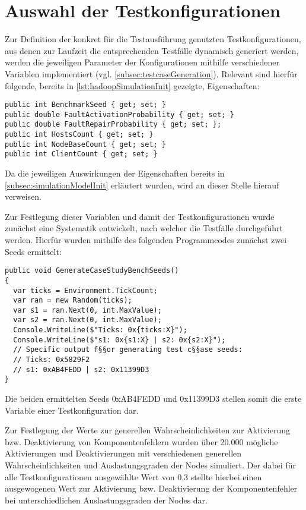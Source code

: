 \section{Auswahl der Testkonfigurationen}
\label{sec:selectTestcases}

Zur Definition der konkret für die Testausführung genutzten Testkonfigurationen, aus denen zur Laufzeit die entsprechenden Testfälle dynamisch generiert werden, werden die jeweiligen Parameter der Konfigurationen mithilfe verschiedener Variablen implementiert (vgl. \cref{subsec:testcaseGeneration}).
Relevant sind hierfür folgende, bereits in \cref{lst:hadoopSimulationInit} gezeigte, Eigenschaften:

\begin{lstlisting}[label=lst:hadoopTest,style=cs,
caption={Zur Definition einer Testkonfiguration relevante Felder}]
public int BenchmarkSeed { get; set; }
public double FaultActivationProbability { get; set; }
public double FaultRepairProbability { get; set; };
public int HostsCount { get; set; }
public int NodeBaseCount { get; set; }
public int ClientCount { get; set; }
\end{lstlisting}

Da die jeweiligen Auswirkungen der Eigenschaften bereits in \cref{subsec:simulationModelInit} erläutert wurden, wird an dieser Stelle hierauf verweisen.

Zur Festlegung dieser Variablen und damit der Testkonfigurationen wurde zunächst eine Systematik entwickelt, nach welcher die Testfälle durchgeführt werden.
Hierfür wurden mithilfe des folgenden Programmcodes zunächst zwei Seeds ermittelt:

\begin{lstlisting}[label=lst:generateTestCaseSeeds,style=cs,
caption={Ermittlung der für die Testkonfigurationen genutzten Basisseeds}]
public void GenerateCaseStudyBenchSeeds()
{
  var ticks = Environment.TickCount;
  var ran = new Random(ticks);
  var s1 = ran.Next(0, int.MaxValue);
  var s2 = ran.Next(0, int.MaxValue);
  Console.WriteLine($"Ticks: 0x{ticks:X}");
  Console.WriteLine($"s1: 0x{s1:X} | s2: 0x{s2:X}");
  // Specific output f§§or generating test c§§ase seeds:
  // Ticks: 0x5829F2
  // s1: 0xAB4FEDD | s2: 0x11399D3
}
\end{lstlisting}

Die beiden ermittelten Seeds 0xAB4FEDD und 0x11399D3 stellen somit die erste Variable einer Testkonfiguration dar.

Zur Festlegung der Werte zur generellen Wahrscheinlichkeiten zur Aktivierung bzw. Deaktivierung von Komponentenfehlern wurden über 20.000 mögliche Aktivierungen und Deaktivierungen mit verschiedenen generellen Wahrscheinlichkeiten und Auslastungsgraden der Nodes simuliert.
Der dabei für alle Testkonfigurationen ausgewählte Wert von 0,3 stellte hierbei einen ausgewogenen Wert zur Aktivierung bzw. Deaktivierung der Komponentenfehler bei unterschiedlichen Auslastungsgraden der Nodes dar.

